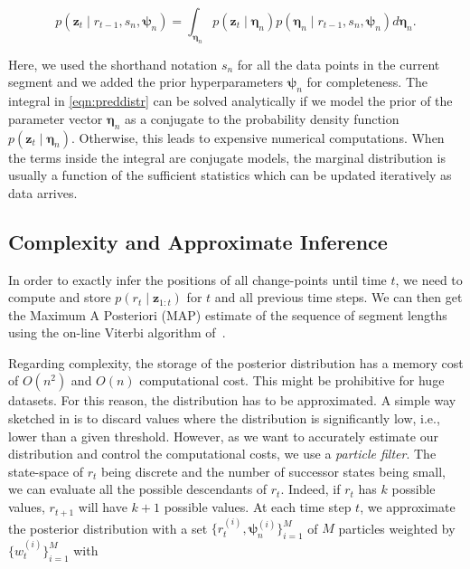 \begin{equation}
\label{eqn:preddistr}
p(\mathbf{z}_t\mid r_{t-1},s_n,\boldsymbol{\psi}_n)=
\int_{\boldsymbol{\eta}_{n}}p(\mathbf{z}_t\mid \boldsymbol{\eta}_{n})
p(\boldsymbol{\eta}_{n}\mid r_{t-1},s_n,\boldsymbol{\psi}_n)
d\boldsymbol{\eta}_{n}.
\end{equation}

Here, we used the shorthand notation $s_n$ for all the data points in the
current segment and we added the prior hyperparameters $\boldsymbol{\psi}_{n}$
for completeness. The integral in \eqref{eqn:preddistr} can be solved
analytically if we model the prior of the parameter vector
$\boldsymbol{\eta}_{n}$ as a conjugate to the probability density function
$p(\mathbf{z}_t\mid \boldsymbol{\eta}_{n})$. Otherwise, this leads to expensive
numerical computations. When the terms inside the integral are conjugate models,
the marginal distribution is usually a function of the sufficient statistics
which can be updated iteratively as data arrives.

\subsection{Complexity and Approximate Inference}
In order to exactly infer the positions of all change-points until time $t$, we
need to compute and store $p(r_t\mid \mathbf{z}_{1:t})$ for $t$ and all previous
time steps. We can then get the Maximum A Posteriori (MAP) estimate of the
sequence of segment lengths using the on-line Viterbi
algorithm of~\cite{fearnhead07online}.

Regarding complexity, the storage of the posterior distribution has a memory
cost of $O(n^2)$ and $O(n)$ computational cost. This might be prohibitive for
huge datasets. For this reason, the distribution has to be approximated. A
simple way sketched in \cite{adams07bayesian} is to discard values where the
distribution is significantly low, i.e., lower than a given threshold. However,
as we want to accurately estimate our distribution and control the computational
costs, we use a \emph{particle filter}. The state-space of $r_t$ being discrete
and the number of successor states being small, we can evaluate all the possible
descendants of $r_t$. Indeed, if $r_t$ has $k$ possible values, $r_{t+1}$ will
have $k+1$ possible values. At each time step $t$, we approximate the posterior
distribution with a set $\{r_t^{(i)},\boldsymbol{\psi}_{n}^{(i)}\}_{i=1}^M$ of
$M$ particles weighted by $\{w_t^{(i)}\}_{i=1}^M$ with

